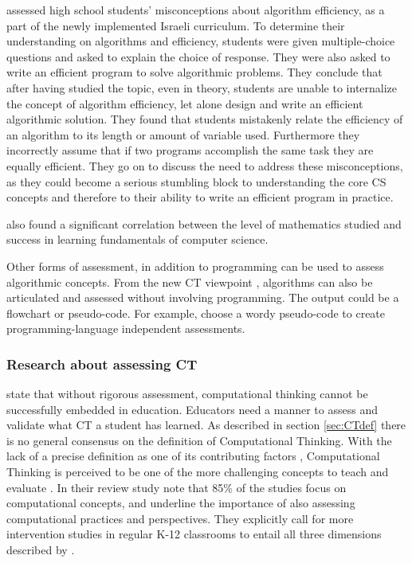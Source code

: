  assessed high school students' misconceptions about algorithm efficiency, as a part of the newly implemented Israeli curriculum. To determine their understanding on algorithms and efficiency, students were given multiple-choice questions and asked to explain the choice of response. They were also asked to write an efficient program to solve algorithmic problems. They conclude that after having studied the topic, even in theory, students are unable to internalize the concept of algorithm efficiency, let alone design and write an efficient algorithmic solution. They found that students mistakenly relate the efficiency of an algorithm to its length or amount of variable used. Furthermore they incorrectly assume that if two programs accomplish the same task they are equally efficient. They go on to discuss the need to address these misconceptions, as they could become a serious stumbling block to understanding the core CS concepts and therefore to their ability to write an efficient program in practice.

\cite{gal2002efficiency} also found a significant correlation between the level of mathematics studied and success in learning fundamentals of computer science.


Other forms of assessment, in addition to programming can be used to assess algorithmic concepts. From the new CT viewpoint \cite{denning2017remaining}, algorithms can also be articulated and assessed without involving programming. The output could be a flowchart \cite{Smetsers2017} or pseudo-code. For example,  choose a wordy pseudo-code to create programming-language independent assessments.


\subsubsection{Research about assessing CT}

 state that without rigorous assessment, computational thinking cannot be successfully embedded in education. Educators need a manner to assess and validate what CT a student has learned. As described in section \ref{sec:CTdef} there is no general consensus on the definition of Computational Thinking. With the lack of a precise definition as one of its contributing factors \cite{crick2017}, Computational Thinking is perceived to be one of the more challenging concepts to teach and evaluate \cite{BrennanResnick2012}.  In their review study  note that 85\% of the studies focus on computational concepts, and underline the importance of also assessing computational practices and perspectives. They explicitly call for more intervention studies in regular K-12 classrooms to entail all three dimensions described by .


